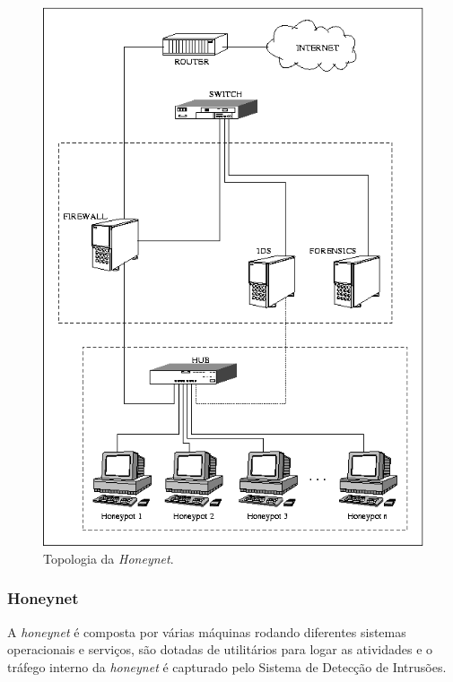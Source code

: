 \begin{figure}[H]
    \begin{center}
        \includegraphics[scale=0.6]{./figuras/topologia-honeynet-br-GS.png}

        \caption{\label{figura:topologia_honeynet}Topologia da \textit{Honeynet}.}
    \end{center}
\end{figure}


\subsubsection{Honeynet}

A \textit{honeynet} é composta por várias máquinas rodando diferentes sistemas operacionais e serviços, são dotadas de utilitários para logar as atividades e o tráfego interno da \textit{honeynet} é capturado pelo Sistema de Detecção de Intrusões.

